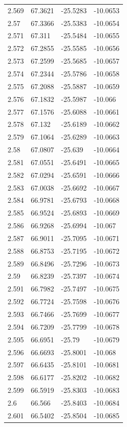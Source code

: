 \begin{tabular}{llll}
2.569 & 67.3621 & -25.5283 & -10.0653 \\
2.57 & 67.3366 & -25.5383 & -10.0654 \\
2.571 & 67.311 & -25.5484 & -10.0655 \\
2.572 & 67.2855 & -25.5585 & -10.0656 \\
2.573 & 67.2599 & -25.5685 & -10.0657 \\
2.574 & 67.2344 & -25.5786 & -10.0658 \\
2.575 & 67.2088 & -25.5887 & -10.0659 \\
2.576 & 67.1832 & -25.5987 & -10.066 \\
2.577 & 67.1576 & -25.6088 & -10.0661 \\
2.578 & 67.132 & -25.6189 & -10.0662 \\
2.579 & 67.1064 & -25.6289 & -10.0663 \\
2.58 & 67.0807 & -25.639 & -10.0664 \\
2.581 & 67.0551 & -25.6491 & -10.0665 \\
2.582 & 67.0294 & -25.6591 & -10.0666 \\
2.583 & 67.0038 & -25.6692 & -10.0667 \\
2.584 & 66.9781 & -25.6793 & -10.0668 \\
2.585 & 66.9524 & -25.6893 & -10.0669 \\
2.586 & 66.9268 & -25.6994 & -10.067 \\
2.587 & 66.9011 & -25.7095 & -10.0671 \\
2.588 & 66.8753 & -25.7195 & -10.0672 \\
2.589 & 66.8496 & -25.7296 & -10.0673 \\
2.59 & 66.8239 & -25.7397 & -10.0674 \\
2.591 & 66.7982 & -25.7497 & -10.0675 \\
2.592 & 66.7724 & -25.7598 & -10.0676 \\
2.593 & 66.7466 & -25.7699 & -10.0677 \\
2.594 & 66.7209 & -25.7799 & -10.0678 \\
2.595 & 66.6951 & -25.79 & -10.0679 \\
2.596 & 66.6693 & -25.8001 & -10.068 \\
2.597 & 66.6435 & -25.8101 & -10.0681 \\
2.598 & 66.6177 & -25.8202 & -10.0682 \\
2.599 & 66.5919 & -25.8303 & -10.0683 \\
2.6 & 66.566 & -25.8403 & -10.0684 \\
2.601 & 66.5402 & -25.8504 & -10.0685 \\

\end{tabular}
